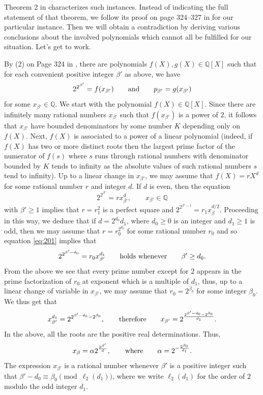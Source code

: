 \documentclass[11pt]{article}
\begin{document}
Theorem 2 in \cite{CZ} characterizes such instances. Instead of indicating the full statement of that theorem, we follow its proof on page 324--327 in \cite{CZ} for our particular instance. 
Then we will obtain a contradiction by deriving various conclusions about the involved polynomials which cannot all be fulfilled for our situation. Let's get to work. 

By (2) on Page 324 in \cite{CZ}, 
there are polynomials $f(X),g(X)\in {\mathbb Q}[X]$ such that for each convenient positive integer $\beta'$ as above, we have 
$$
2^{2^{\beta'}}=f(x_{\beta'})\qquad {\text{\rm and}}\qquad p_{\beta'}=g(x_{\beta'})
$$
for some $x_{\beta'}\in {\mathbb Q}$. We start with the polynomial $f(X)\in {\mathbb Q}[X]$. Since there are infinitely many  rational numbers $x_{\beta'}$ such that $f(x_{\beta'})$ is a power of $2$, it follows that
$x_{\beta'}$ have bounded denominators by some number $K$ depending only on $f(X)$. Next,  $f(X)$ is associated to a power of a linear polynomial (indeed, if $f(X)$ has two or more distinct roots then the largest prime factor of the numerator of $f(s)$ where 
$s$ runs through rational numbers with denominator bounded by $K$ tends to infinity as the absolute values of such rational numbers $s$ tend to infinity). Up to a linear change in $x_{\beta'}$, we may assume that $f(X)=rX^d$ for some rational number $r$ and integer $d$. If $d$ is even, then the equation
\begin{equation}
\label{eq:201}
2^{2^{\beta'}}=rx_{\beta'}^d,\qquad x_{\beta'}\in {\mathbb Q}
\end{equation}
with $\beta'\ge 1$ implies that $r=r_1^2$ is a perfect square and $2^{2^{\beta'-1}}=r_1x_{\beta}^{d/2}$. Proceeding in this way, we deduce that if $d=2^{d_0}d_1$, where $d_0\ge 0$ is an integer and $d_1\ge 1$ is odd, then 
we may assume that $r=r_0^{2^{d_0}}$ for some rational number $r_0$ and so equation \eqref{eq:201} implies that 
$$
2^{2^{\beta'-d_0}}=r_0x_{\beta'}^{d_1}\qquad {\text{\rm holds whenever}}\qquad \beta'\ge d_0.
$$
From the above we see that every prime number except for $2$ appears in the prime  factorization of $r_0$ at exponent which is a multiple of $d_1$, thus, up to a linear change of variable in  $x_{\beta'}$, we may assume that 
$r_0=2^{\beta_0}$ for some integer $\beta_0$. We thus get that 
$$
x_{\beta'}^{d_1}=2^{2^{\beta'-d_0}-2^{\beta_0}},\qquad {\text{\rm therefore}}\qquad x_{\beta'}=2^{\frac{2^{\beta'-d_0}-2^{\beta_0}}{d_1}}.
$$
In the above, all the roots are the positive real determinations.  Thus, 
$$
x_{\beta}=\alpha 2^{\frac{2^{\beta'}}{d}},\qquad {\text{\rm where}}\qquad \alpha=2^{-\frac{2^{\beta_0}}{d_1}}.
$$
The expression $x_{\beta'}$ is a rational number whenever $\beta'$ is a positive integer such that $\beta'-d_0\equiv \beta_0\pmod {\ell_2(d_1)}$, where we write $\ell_2(d_1)$ for the order of $2$ modulo the odd integer $d_1$. 
\end{document}
